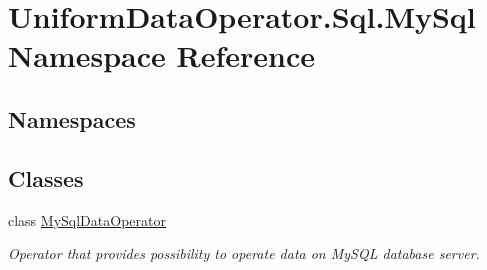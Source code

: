 \hypertarget{namespace_uniform_data_operator_1_1_sql_1_1_my_sql}{}\section{Uniform\+Data\+Operator.\+Sql.\+My\+Sql Namespace Reference}
\label{namespace_uniform_data_operator_1_1_sql_1_1_my_sql}
\subsection*{Namespaces}
\begin{DoxyCompactItemize}
\end{DoxyCompactItemize}
\subsection*{Classes}
\begin{DoxyCompactItemize}
\item 
class \mbox{\hyperlink{class_uniform_data_operator_1_1_sql_1_1_my_sql_1_1_my_sql_data_operator}{My\+Sql\+Data\+Operator}}
\begin{DoxyCompactList}\small\item\em Operator that provides possibility to operate data on My\+S\+QL database server. \end{DoxyCompactList}\end{DoxyCompactItemize}
